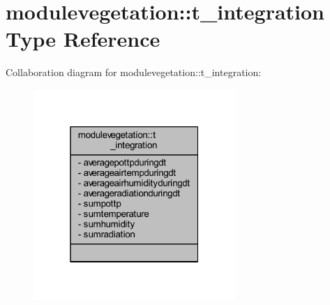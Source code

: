 \hypertarget{structmodulevegetation_1_1t__integration}{}\section{modulevegetation\+:\+:t\+\_\+integration Type Reference}
\label{structmodulevegetation_1_1t__integration}


Collaboration diagram for modulevegetation\+:\+:t\+\_\+integration\+:\nopagebreak
\begin{figure}[H]
\begin{center}
\leavevmode
\includegraphics[width=217pt]{structmodulevegetation_1_1t__integration__coll__graph}
\end{center}
\end{figure}

